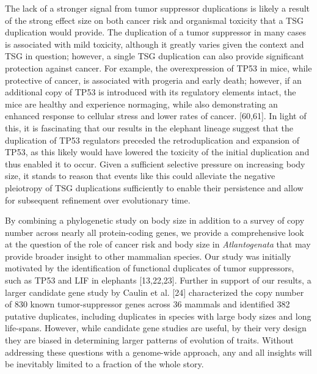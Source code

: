 \documentclass[]{elsarticle} %
\begin{document}
The lack of a stronger signal from tumor suppressor duplications is likely a result of the strong effect size on both cancer risk and organismal toxicity that a TSG duplication would provide. The duplication of a tumor suppressor in many cases is associated with mild toxicity, although it greatly varies given the context and TSG in question; however, a single TSG duplication can also provide significant protection against cancer. For example, the overexpression of TP53 in mice, while protective of cancer, is associated with progeria and early death; however, if an additional copy of TP53 is introduced with its regulatory elements intact, the mice are healthy and experience normaging, while also demonstrating an enhanced response to cellular stress and lower rates of cancer. {[}60,61{]}. In light of this, it is fascinating that our results in the elephant lineage suggest that the duplication of TP53 regulators preceded the retroduplication and expansion of TP53, as this likely would have lowered the toxicity of the initial duplication and thus enabled it to occur. Given a sufficient selective pressure on increasing body size, it stands to reason that events like this could alleviate the negative pleiotropy of TSG duplications sufficiently to enable their persistence and allow for subsequent refinement over evolutionary time.

By combining a phylogenetic study on body size in addition to a survey of copy number across nearly all protein-coding genes, we provide a comprehensive look at the question of the role of cancer risk and body size in \emph{Atlantogenata} that may provide broader insight to other mammalian species. Our study was initially motivated by the identification of functional duplicates of tumor suppressors, such as TP53 and LIF in elephants {[}13,22,23{]}. Further in support of our results, a larger candidate gene study by Caulin et al. {[}24{]} characterized the copy number of 830 known tumor-suppressor genes across 36 mammals and identified 382 putative duplicates, including duplicates in species with large body sizes and long life-spans. However, while candidate gene studies are useful, by their very design they are biased in determining larger patterns of evolution of traits. Without addressing these questions with a genome-wide approach, any and all insights will be inevitably limited to a fraction of the whole story.
\end{document}
